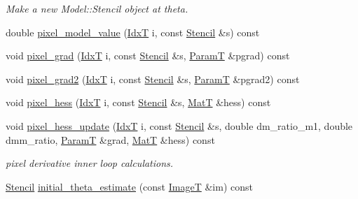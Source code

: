 \begin{DoxyCompactItemize}
\begin{DoxyCompactList}\small\item\em Make a new Model\+::\+Stencil object at theta. \end{DoxyCompactList}\item 
double \hyperlink{classmappel_1_1Gauss1DModel_af26feda273232841ae28b85b0dbab439}{pixel\+\_\+model\+\_\+value} (\hyperlink{namespacemappel_ab17ec0f30b61ece292439d7ece81d3a8}{IdxT} i, const \hyperlink{classmappel_1_1Gauss1DModel_1_1Stencil}{Stencil} \&s) const 
\item 
void \hyperlink{classmappel_1_1Gauss1DModel_ae17d888bf89ea80c39c9839144015b55}{pixel\+\_\+grad} (\hyperlink{namespacemappel_ab17ec0f30b61ece292439d7ece81d3a8}{IdxT} i, const \hyperlink{classmappel_1_1Gauss1DModel_1_1Stencil}{Stencil} \&s, \hyperlink{classmappel_1_1PointEmitterModel_a665ec6aea3aac139bb69a23c06d4b9a1}{ParamT} \&pgrad) const 
\item 
void \hyperlink{classmappel_1_1Gauss1DModel_aeb6090ca6812629d8b719ed9a45cf7f3}{pixel\+\_\+grad2} (\hyperlink{namespacemappel_ab17ec0f30b61ece292439d7ece81d3a8}{IdxT} i, const \hyperlink{classmappel_1_1Gauss1DModel_1_1Stencil}{Stencil} \&s, \hyperlink{classmappel_1_1PointEmitterModel_a665ec6aea3aac139bb69a23c06d4b9a1}{ParamT} \&pgrad2) const 
\item 
void \hyperlink{classmappel_1_1Gauss1DModel_a407773f7ffe464018fbaa18e8c8fe22a}{pixel\+\_\+hess} (\hyperlink{namespacemappel_ab17ec0f30b61ece292439d7ece81d3a8}{IdxT} i, const \hyperlink{classmappel_1_1Gauss1DModel_1_1Stencil}{Stencil} \&s, \hyperlink{namespacemappel_a7091ab87c528041f7e2027195fad8915}{MatT} \&hess) const 
\item 
void \hyperlink{classmappel_1_1Gauss1DModel_a6b0a57e7620ef80030c94903aae5954f}{pixel\+\_\+hess\+\_\+update} (\hyperlink{namespacemappel_ab17ec0f30b61ece292439d7ece81d3a8}{IdxT} i, const \hyperlink{classmappel_1_1Gauss1DModel_1_1Stencil}{Stencil} \&s, double dm\+\_\+ratio\+\_\+m1, double dmm\+\_\+ratio, \hyperlink{classmappel_1_1PointEmitterModel_a665ec6aea3aac139bb69a23c06d4b9a1}{ParamT} \&grad, \hyperlink{namespacemappel_a7091ab87c528041f7e2027195fad8915}{MatT} \&hess) const 
\begin{DoxyCompactList}\small\item\em pixel derivative inner loop calculations. \end{DoxyCompactList}\item 
\hyperlink{classmappel_1_1Gauss1DModel_1_1Stencil}{Stencil} \hyperlink{classmappel_1_1Gauss1DModel_a055a3bd9bc0ff8540a48a1c6f50ec523}{initial\+\_\+theta\+\_\+estimate} (const \hyperlink{classmappel_1_1ImageFormat1DBase_a521a1ff391a52a636fac4aac7c7ba02c}{ImageT} \&im) const 

\end{DoxyCompactItemize}
